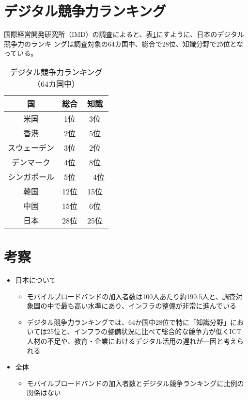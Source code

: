 \documentclass[a4paper,11pt,dvipdfmx]{ujarticle}
\begin{document}
\section{デジタル競争力ランキング}
国際経営開発研究所（IMD）の調査\cite{imd}によると、表\ref{tbl:myTbl}にすように、日本のデジタル競争力のランキ
ングは調査対象の64カ国中、総合で28位、知識分野で25位となっている。
\begin{table}[htbp]    
    \centering
    \caption{デジタル競争力ランキング（64カ国中）}\label{tbl:myTbl}
    \begin{tabular}{|c|c|c|}
        \hline
        国  & 総合 & 知識 \\
        \hline
        米国  & 1位 &3位 \\
        \hline
        香港  & 2位 & 5位 \\
        \hline
        スウェーデン  & 3位 & 2位 \\
        \hline
        デンマーク  & 4位 & 8位 \\
        \hline
        シンガポール  & 5位 &　4位 \\
        \hline
        \hline
        韓国  & 12位 & 15位 \\
        \hline
        中国  & 15位 & 6位 \\
        \hline
        \hline
        日本 & 28位 & 25位 \\
        \hline
    \end{tabular}
\end{table}      

\section{考察}
\begin{itemize}
    \item 日本について
    \begin{itemize}
        \item モバイルブロードバンドの加入者数は100人あたり約190.5人と、調査対象国の中で最も高い水準にあり、インフラの整備が非常に進んでいる
        \item デジタル競争力ランキングでは、64か国中28位で特に「知識分野」においては25位と、インフラの整備状況に比べて総合的な競争力が低くICT人材の不足や、教育・企業におけるデジタル活用の遅れが一因と考えられる
    \end{itemize}
    \item 全体
    \begin{itemize}
        \item モバイルブロードバンドの加入者数とデジタル競争ランキングに比例の関係はない
    \end{itemize}
\end{itemize}


\cite{oecd}
\cite{imd}


\end{document}
